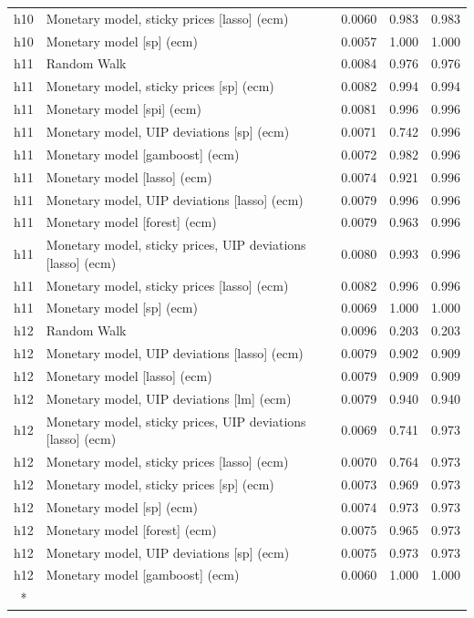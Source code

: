 \begin{ThreePartTable}
\begin{longtable}[t]{cp{5.5cm}ccc}
h10 & \raggedright Monetary model, sticky prices [lasso] (ecm) & 0.0060 & 0.983 & 0.983\\
h10 & \raggedright Monetary model [sp] (ecm) & 0.0057 & 1.000 & 1.000\\
\addlinespace
h11 & \raggedright Random Walk & 0.0084 & 0.976 & 0.976\\
h11 & \raggedright Monetary model, sticky prices [sp] (ecm) & 0.0082 & 0.994 & 0.994\\
h11 & \raggedright Monetary model [spi] (ecm) & 0.0081 & 0.996 & 0.996\\
h11 & \raggedright Monetary model, UIP deviations [sp] (ecm) & 0.0071 & 0.742 & 0.996\\
h11 & \raggedright Monetary model [gamboost] (ecm) & 0.0072 & 0.982 & 0.996\\
h11 & \raggedright Monetary model [lasso] (ecm) & 0.0074 & 0.921 & 0.996\\
h11 & \raggedright Monetary model, UIP deviations [lasso] (ecm) & 0.0079 & 0.996 & 0.996\\
h11 & \raggedright Monetary model [forest] (ecm) & 0.0079 & 0.963 & 0.996\\
h11 & \raggedright Monetary model, sticky prices, UIP deviations [lasso] (ecm) & 0.0080 & 0.993 & 0.996\\
h11 & \raggedright Monetary model, sticky prices [lasso] (ecm) & 0.0082 & 0.996 & 0.996\\
h11 & \raggedright Monetary model [sp] (ecm) & 0.0069 & 1.000 & 1.000\\
\addlinespace
h12 & \raggedright Random Walk & 0.0096 & 0.203 & 0.203\\
h12 & \raggedright Monetary model, UIP deviations [lasso] (ecm) & 0.0079 & 0.902 & 0.909\\
h12 & \raggedright Monetary model [lasso] (ecm) & 0.0079 & 0.909 & 0.909\\
h12 & \raggedright Monetary model, UIP deviations [lm] (ecm) & 0.0079 & 0.940 & 0.940\\
h12 & \raggedright Monetary model, sticky prices, UIP deviations [lasso] (ecm) & 0.0069 & 0.741 & 0.973\\
h12 & \raggedright Monetary model, sticky prices [lasso] (ecm) & 0.0070 & 0.764 & 0.973\\
h12 & \raggedright Monetary model, sticky prices [sp] (ecm) & 0.0073 & 0.969 & 0.973\\
h12 & \raggedright Monetary model [sp] (ecm) & 0.0074 & 0.973 & 0.973\\
h12 & \raggedright Monetary model [forest] (ecm) & 0.0075 & 0.965 & 0.973\\
h12 & \raggedright Monetary model, UIP deviations [sp] (ecm) & 0.0075 & 0.973 & 0.973\\
h12 & \raggedright Monetary model [gamboost] (ecm) & 0.0060 & 1.000 & 1.000\\*
\end{longtable}
\end{ThreePartTable}
\endgroup{}
